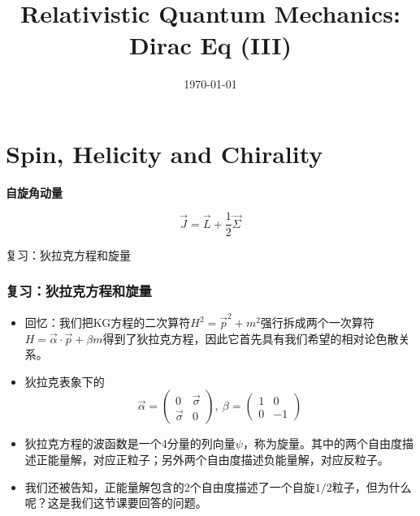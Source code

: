 \documentclass[aspectratio=1610,14pt,matheuler]{beamer}
\title{Relativistic Quantum Mechanics: Dirac Eq (III)}
\date{\today}
\newcommand{\bch}{}
\newcommand{\ech}{}
\def\bcenter{\begin{center}}
\def\ecenter{\end{center}}
\def\skipline{{\vskip0.1in}}
\def\tbox#1{\begin{tcolorbox}#1\end{tcolorbox}}
\def\secpage#1#2{\begin{frame}\bch\bcenter{\bf \Huge #1} \skipline \tbox{#2}\ecenter\ech\end{frame}}
\newcommand{\mat}[1]{\begin{pmatrix}#1\end{pmatrix}}
\begin{document}
\begin{frame}
 
\titlepage
\begin{center}
\tableofcontents
\end{center}

\end{frame}

\section{Spin, Helicity and Chirality}
\secpage{自旋角动量}{$$\vec J = \vec L + \frac{1}{2} \vec \varSigma$$}

\begin{frame}{复习：狄拉克方程和旋量 }
\frametitle{\bch 复习：狄拉克方程和旋量 \ech}
\bch
\begin{itemize}
\item 回忆：我们把KG方程的二次算符$H^2=\vec p^2 + m^2$强行拆成两个一次算符$H=\vec \alpha \cdot \vec p + \beta m$得到了狄拉克方程，因此它首先具有我们希望的相对论色散关系。
\item 狄拉克表象下的
$$
\vec \alpha = \mat{0 & \vec \sigma \\ \vec \sigma & 0},\ \beta = \mat{1 & 0 \\ 0 & -1}
$$
\item
狄拉克方程的波函数是一个4分量的列向量$\psi$，称为旋量。其中的两个自由度描述正能量解，对应正粒子；另外两个自由度描述负能量解，对应反粒子。
\item
我们还被告知，正能量解包含的2个自由度描述了一个自旋$1/2$粒子，但为什么呢？这是我们这节课要回答的问题。
\end{itemize}
\ech
\end{frame}
\end{document}
